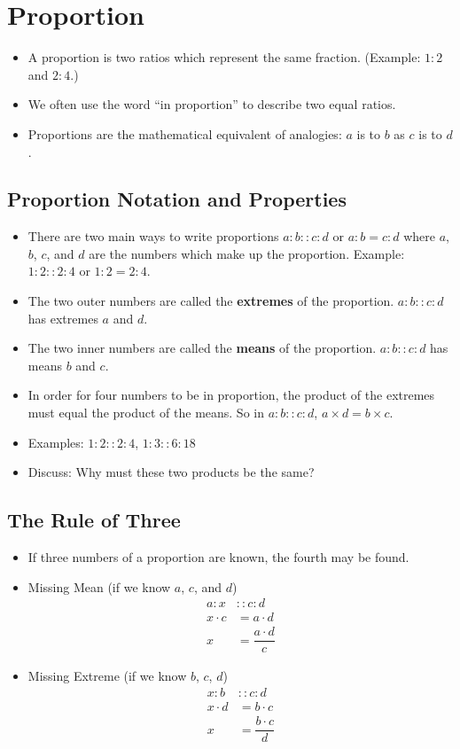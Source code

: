 \documentclass{article}
\begin{document}
\section*{Proportion}
\begin{itemize}
  \item A proportion is two ratios which represent the same fraction.  (Example: $1:2$ and $2:4$.)
  \item We often use the word ``in proportion'' to describe two equal ratios.
  \item Proportions are the mathematical equivalent of analogies: $a$ is to $b$ as $c$ is to $d$.
\end{itemize}
\subsection*{Proportion Notation and Properties}
\begin{itemize}
    \item There are two main ways to write proportions $a:b :: c:d$ or $a:b = c:d$ where $a$, $b$, $c$, and $d$ are the numbers which make up the proportion.  Example: $1:2::2:4$ or $1:2=2:4$.
    \item The two outer numbers are called the {\bf extremes} of the proportion.  $a:b::c:d$ has extremes $a$ and $d$.
    \item The two inner numbers are called the {\bf means} of the proportion.  $a:b::c:d$ has means $b$ and $c$.
    \item In order for four numbers to be in proportion, the product of the extremes must equal the product of the means.  So in $a:b::c:d$, $a\times d = b \times c$.
    \item Examples: $1:2::2:4$, $1:3::6:18$
    \item Discuss: Why must these two products be the same?
\end{itemize}

\subsection*{The Rule of Three}
\begin{itemize}
    \item If three numbers of a proportion are known, the fourth may be found.  
    \item Missing Mean (if we know $a$, $c$, and $d$)
    \begin{align*}
        a:x &:: c:d\\
        x\cdot c &= a \cdot d\\
        x &=\dfrac{a\cdot d}{c}
    \end{align*}
    
    \item Missing Extreme (if we know $b$, $c$, $d$)
    \begin{align*}
        x:b &:: c:d\\
        x\cdot d &= b \cdot c \\
        x &= \dfrac{b \cdot c}{d}
    \end{align*}
\end{itemize}
\end{document}
